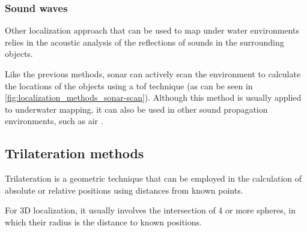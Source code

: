 \subsubsection{Sound waves}

Other localization approach that can be used to map under water environments relies in the acoustic analysis of the reflections of sounds in the surrounding objects.

Like the previous methods, \gls{sonar} can actively scan the environment to calculate the locations of the objects using a \gls{tof} technique (as can be seen in \cref{fig:localization_methods_sonar-scan}). Although this method is usually applied to underwater mapping, it can also be used in other sound propagation environments, such as air \cite{Guarato2013}.



\subsection{Trilateration methods}

Trilateration is a geometric technique that can be employed in the calculation of absolute or relative positions using distances from known points.

For 3D localization, it usually involves the intersection of 4 or more spheres, in which their radius is the distance to known positions.


